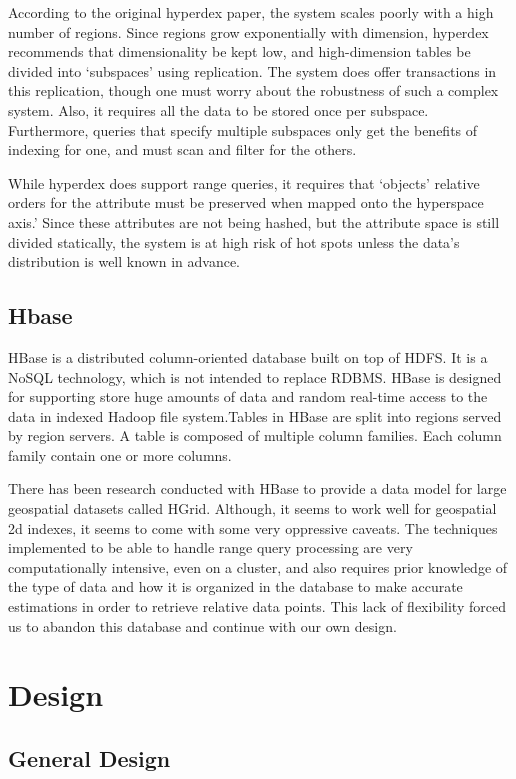 \documentclass[11pt]{article}
\begin{document}
According to the original hyperdex paper, the system scales poorly with a high number of regions. Since regions grow exponentially with dimension, hyperdex recommends that dimensionality be kept low, and high-dimension tables be divided into `subspaces' using replication. The system does offer transactions in this replication, though one must worry about the robustness of such a complex system. Also, it requires all the data to be stored once per subspace. Furthermore, queries that specify multiple subspaces only get the benefits of indexing for one, and must scan and filter for the others.

While hyperdex does support range queries, it requires that `objects' relative orders for the attribute must be preserved when mapped onto the hyperspace axis.' Since these attributes are not being hashed, but the attribute space is still divided statically, the system is at high risk of hot spots unless the data's distribution is well known in advance.

\subsection{Hbase}

HBase is a distributed column-oriented database built on top of HDFS. It is a NoSQL technology, which is not intended to replace RDBMS. HBase is designed for supporting store huge amounts of data and random real-time access to the data in indexed Hadoop file system.Tables in HBase are split into regions served by region servers. A table is composed of multiple column families. Each column family contain one or more columns. 

There has been research conducted with HBase to provide a data model for large geospatial datasets called HGrid. Although, it seems to work well for geospatial 2d indexes, it seems to come with some very oppressive caveats. The techniques implemented to be able to handle range query processing are very computationally intensive, even on a cluster, and also requires prior knowledge of the type of data and how it is organized in the database to make accurate estimations in order to retrieve relative data points. This lack of flexibility forced us to abandon this database and continue with our own design.

\section{Design}

\subsection{General Design}
\end{document}

